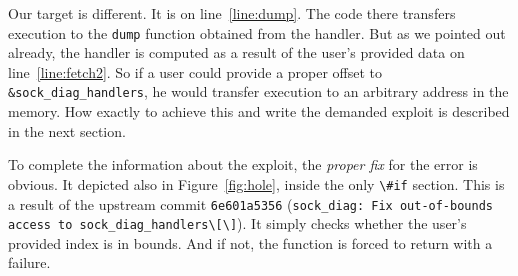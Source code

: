 \documentclass[10pt]{llncs}
\newcommand{\code}[2][]{\lstinline[columns=fullflexible, #1]$#2$}
\begin{document}
Our target is different. It is on line~\ref{line:dump}. The code there
transfers execution to the \code{dump} function obtained from the handler. But
as we pointed out already, the handler is computed as a result of the user's
provided data on line~\ref{line:fetch2}. So if a user could provide a proper
offset to \code{&sock_diag_handlers}, he would transfer execution to an
arbitrary address in the memory. How exactly to achieve this and write the
demanded exploit is described in the next section.

To complete the information about the exploit, the \emph{proper fix} for the
error is obvious. It depicted also in Figure~\ref{fig:hole}, inside the
only \code{\#if} section. This is a result of the upstream commit
\texttt{6e601a5356} (\code{sock_diag: Fix out-of-bounds access to
sock_diag_handlers\[\]}). It simply checks whether the user's provided index
is in bounds. And if not, the function is forced to return with a failure.
\end{document}
